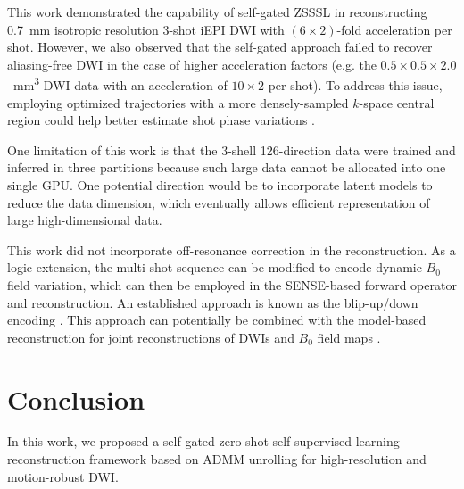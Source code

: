 \documentclass[journal,twoside,web]{ieeecolor}
\begin{document}
	This work demonstrated the capability of self-gated ZSSSL in
	reconstructing \SI{0.7}{mm} isotropic resolution 3-shot iEPI DWI
	with $(6 \times 2)$-fold acceleration per shot.
	However, we also observed that the self-gated approach
	failed to recover aliasing-free DWI
	in the case of higher acceleration factors
	(e.g. the $0.5\times0.5\times2.0$~\si{mm^3} DWI data
	with an acceleration of $10\times2$ per shot).
	To address this issue, employing optimized trajectories
	with a more densely-sampled $k$-space central region
	could help better estimate shot phase variations
	\cite{liu_2004_diff_spiral,dai_2023_epti-diff}.

	One limitation of this work is that the 3-shell 126-direction data
	were trained and inferred in three partitions
	because such large data cannot be allocated into one single GPU.
	One potential direction would be to incorporate latent models \cite{kingma_2014_vae}
	to reduce the data dimension, which eventually allows efficient representation
	of large high-dimensional data.

	This work did not incorporate off-resonance correction in the reconstruction.
	As a logic extension, the multi-shot sequence can be modified
	to encode dynamic $B_0$ field variation, which can then be employed in the SENSE-based forward operator and reconstruction. An established approach
	is known as the blip-up/down encoding \cite{zahneisen_2017_blipud}.
	This approach can potentially be combined with the model-based reconstruction
	for joint reconstructions of DWIs and $B_0$ field maps \cite{tan_2022_meco}.

	\section{Conclusion}

	In this work, we proposed a self-gated zero-shot self-supervised learning
	reconstruction framework based on ADMM unrolling
	for high-resolution and motion-robust DWI.




	
	
\end{document}
